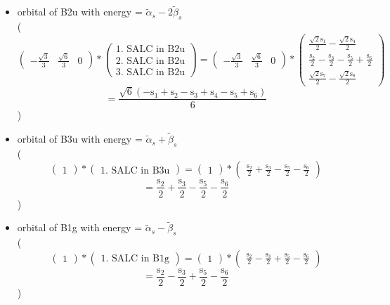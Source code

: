 \documentclass[12pt,a4paper]{article}
\begin{document}
\begin{itemize}
\item orbital of B2u with energy = 
                                $\tilde{\alpha}_{s} - 2 \tilde{\beta}_{s}$ \\
( 
$$
\begin{pmatrix}- \frac{\sqrt{3}}{3} & \frac{\sqrt{6}}{3} & 0\end{pmatrix} * \left(\begin{array}{c}\text{1. SALC in B2u} \\ \text{2. SALC in B2u} \\ \text{3. SALC in B2u}\end{array}\right) = \begin{pmatrix}- \frac{\sqrt{3}}{3} & \frac{\sqrt{6}}{3} & 0\end{pmatrix} * \begin{pmatrix}\frac{\sqrt{2} \text{s}_{1}}{2} - \frac{\sqrt{2} \text{s}_{4}}{2}\\\frac{\text{s}_{2}}{2} - \frac{\text{s}_{3}}{2} - \frac{\text{s}_{5}}{2} + \frac{\text{s}_{6}}{2}\\\frac{\sqrt{2} \text{s}_{7}}{2} - \frac{\sqrt{2} \text{s}_{8}}{2}\end{pmatrix} 
 $$ $$ = \frac{\sqrt{6} \left(- \text{s}_{1} + \text{s}_{2} - \text{s}_{3} + \text{s}_{4} - \text{s}_{5} + \text{s}_{6}\right)}{6} 
 $$ 
 )

\item orbital of B3u with energy = 
                                $\tilde{\alpha}_{s} + \tilde{\beta}_{s}$ \\
( 
$$
\begin{pmatrix}1\end{pmatrix} * \left(\begin{array}{c}\text{1. SALC in B3u}\end{array}\right) = \begin{pmatrix}1\end{pmatrix} * \begin{pmatrix}\frac{\text{s}_{2}}{2} + \frac{\text{s}_{3}}{2} - \frac{\text{s}_{5}}{2} - \frac{\text{s}_{6}}{2}\end{pmatrix} 
 $$ $$ = \frac{\text{s}_{2}}{2} + \frac{\text{s}_{3}}{2} - \frac{\text{s}_{5}}{2} - \frac{\text{s}_{6}}{2} 
 $$ 
 )

\item orbital of B1g with energy = 
                                $\tilde{\alpha}_{s} - \tilde{\beta}_{s}$ \\
( 
$$
\begin{pmatrix}1\end{pmatrix} * \left(\begin{array}{c}\text{1. SALC in B1g}\end{array}\right) = \begin{pmatrix}1\end{pmatrix} * \begin{pmatrix}\frac{\text{s}_{2}}{2} - \frac{\text{s}_{3}}{2} + \frac{\text{s}_{5}}{2} - \frac{\text{s}_{6}}{2}\end{pmatrix} 
 $$ $$ = \frac{\text{s}_{2}}{2} - \frac{\text{s}_{3}}{2} + \frac{\text{s}_{5}}{2} - \frac{\text{s}_{6}}{2} 
 $$ 
 )

\end{itemize}
\end{document}
